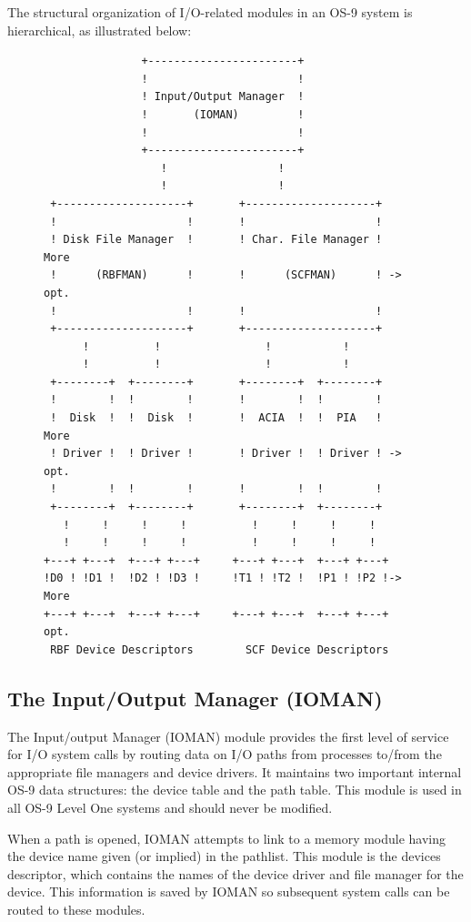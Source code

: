 \documentclass[
]{article}
\begin{document}
The structural organization of I/O-related modules in an OS-9 system is
hierarchical, as illustrated below:

\begin{figure}
\centering
\begin{verbatim}
               +-----------------------+
               !                       !
               ! Input/Output Manager  !
               !       (IOMAN)         !
               !                       !
               +-----------------------+
                  !                 !
                  !                 !
 +--------------------+       +--------------------+
 !                    !       !                    !
 ! Disk File Manager  !       ! Char. File Manager !    More
 !      (RBFMAN)      !       !      (SCFMAN)      ! -> opt.
 !                    !       !                    !
 +--------------------+       +--------------------+
      !          !                !           !
      !          !                !           !
 +--------+  +--------+       +--------+  +--------+
 !        !  !        !       !        !  !        !
 !  Disk  !  !  Disk  !       !  ACIA  !  !  PIA   !    More
 ! Driver !  ! Driver !       ! Driver !  ! Driver ! -> opt.
 !        !  !        !       !        !  !        !
 +--------+  +--------+       +--------+  +--------+
   !     !     !     !          !     !     !     !
   !     !     !     !          !     !     !     !
+---+ +---+  +---+ +---+     +---+ +---+  +---+ +---+
!D0 ! !D1 !  !D2 ! !D3 !     !T1 ! !T2 !  !P1 ! !P2 !-> More
+---+ +---+  +---+ +---+     +---+ +---+  +---+ +---+   opt.
 RBF Device Descriptors        SCF Device Descriptors
\end{verbatim}
\caption{}
\end{figure}

\subsection{The Input/Output Manager (IOMAN)}

The Input/output Manager (IOMAN) module provides the first level of
service for I/O system calls by routing data on I/O paths from processes
to/from the appropriate file managers and device drivers. It maintains
two important internal OS-9 data structures: the device table and the
path table. This module is used in all OS-9 Level One systems and should
never be modified.

When a path is opened, IOMAN attempts to link to a memory module having
the device name given (or implied) in the pathlist. This module is the
device\textquotesingle s descriptor, which contains the names of the
device driver and file manager for the device. This information is saved
by IOMAN so subsequent system calls can be routed to these modules.
\end{document}
